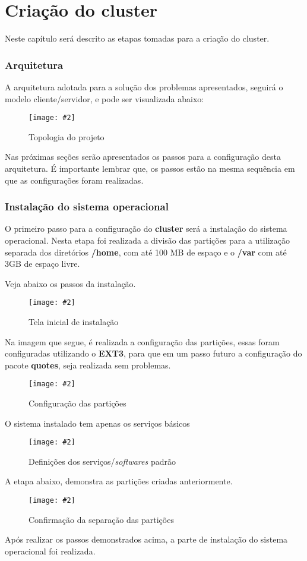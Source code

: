 \documentclass[
	12pt,				%
	openany,			%
	a4paper,			%
	chapter=TITLE,		%
	section=TITLE,		%
	english,
	brazil				%
]{abntex2}
\newcommand{\includeImage}[3] {

\begin{figure}[H]
 	 \centering
  		\texttt{[image: \#2]}
  	\caption{#3}
\end{figure}

}
\begin{document}
\chapter{Criação do cluster}

Neste capítulo será descrito as etapas tomadas para a criação do cluster. 

\subsection{Arquitetura}

A arquitetura adotada para a solução dos problemas apresentados, seguirá o modelo cliente/servidor, e pode ser visualizada abaixo:

\includeImage{0.5}{imgs/others/topologia.png}{Topologia do projeto}

Nas próximas seções serão apresentados os passos para a configuração desta arquitetura. É importante lembrar que, os passos estão na mesma sequência em que as configurações foram realizadas.

\subsection{Instalação do sistema operacional}

O primeiro passo para a configuração do \textbf{cluster} será a instalação do sistema operacional. Nesta etapa foi realizada a divisão das partições para a utilização separada dos diretórios \textbf{/home}, com até 100 MB de espaço e o \textbf{/var} com até 3GB de espaço livre.

Veja abaixo os passos da instalação.

\includeImage{0.5}{imgs/1_instalacao/1.png}{Tela inicial de instalação}

Na imagem que segue, é realizada a configuração das partições, essas foram configuradas utilizando o \textbf{EXT3}, para que em um passo futuro a configuração do pacote \textbf{quotes}, seja realizada sem problemas.
\includeImage{0.5}{imgs/1_instalacao/2.png}{Configuração das partições}

O sistema instalado tem apenas os serviços básicos
\includeImage{0.5}{imgs/1_instalacao/3.png}{Definições dos serviços/\textit{softwares} padrão}

A etapa abaixo, demonstra as partições criadas anteriormente.
\includeImage{0.5}{imgs/1_instalacao/4.png}{Confirmação da separação das partições}


Após realizar os passos demonstrados acima, a parte de instalação do sistema operacional foi realizada.
\end{document}
